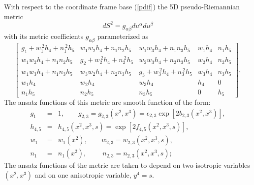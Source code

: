 \documentclass[a4paper,preprint,prabib,aps]{revtex4}
\begin{document}
With respect to the coordinate frame base (\ref{pdif}) the 5D
pseudo-Riemannian metric
\begin{equation}
dS^{2}=g_{\alpha \beta }du^{\alpha }du^{\beta }  \label{metric1}
\end{equation}
with its metric coefficients $g_{\alpha \beta }$ parameterized as
\begin{equation}
\left[
\begin{array}{ccccc}
g_{1}+w_{1}^{\ 2}h_{4}+n_{1}^{\ 2}h_{5} & w_{1}w_{2}h_{4}+n_{1}n_{2}h_{5} &
w_{1}w_{3}h_{4}+n_{1}n_{3}h_{5} & w_{1}h_{4} & n_{1}h_{5} \\
w_{1}w_{2}h_{4}+n_{1}n_{2}h_{5} & g_{2}+w_{2}^{\ 2}h_{4}+n_{2}^{\ 2}h_{5} &
w_{2}w_{3}h_{4}+n_{2}n_{3}h_{5} & w_{2}h_{4} & n_{2}h_{5} \\
w_{1}w_{3}h_{4}+n_{1}n_{3}h_{5} & w_{3}w_{2}h_{4}+n_{2}n_{3}h_{5} &
g_{3}+w_{3}^{\ 2}h_{4}+n_{3}^{\ 2}h_{5} & w_{3}h_{4} & n_{3}h_{5} \\
w_{1}h_{4} & w_{2}h_{4} & w_{3}h_{4} & h_{4} & 0 \\
n_{1}h_{5} & n_{2}h_{5} & n_{3}h_{5} & 0 & h_{5}
\end{array}
\right] ,  \label{ansatz0}
\end{equation}
The ansatz functions of this metric are smooth function of the form:
\begin{eqnarray}
g_{1} &=&1,\qquad g_{2,3}=g_{2,3}(x^{2},x^{3})=\epsilon _{2,3}\exp
[2b_{2,3}(x^{2},x^{3})],  \label{bvar} \\
h_{4,5} &=&h_{4,5}(x^{2},x^{3},s)=\exp [2f_{4,5}(x^{2},x^{3},s)],
\label{qvar} \\
w_{1} &=&w_{1}(x^{2}),\qquad w_{2,3}=w_{2,3}(x^{2},x^{3},s),  \nonumber \\
n_{1} &=&n_{1}(x^{2}),\qquad \;n_{2,3}=n_{2,3}(x^{2},x^{3},s);  \nonumber
\end{eqnarray}
The ansatz functions of the metric are taken to depend on two isotropic
variables $(x^{2},x^{3})$ and on one anisotropic variable, $y^{4}=s$.
\end{document}
